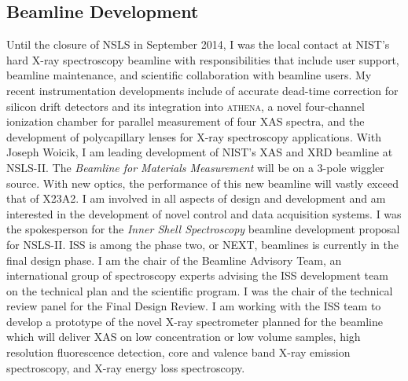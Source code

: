 \documentclass[11pt]{moderncv}
\begin{document}
\subsection{Beamline Development}
%
{Until the closure of NSLS in September 2014, I was the local contact
  at NIST's hard X-ray spectroscopy beamline with responsibilities
  that include user support, beamline maintenance, and scientific
  collaboration with beamline users.  My recent instrumentation
  developments include of accurate dead-time correction for silicon
  drift detectors and its integration into \textsc{athena}, a novel
  four-channel ionization chamber for parallel measurement of four XAS
  spectra, and the development of polycapillary lenses for X-ray
  spectroscopy applications.}
%
%
{With Joseph Woicik, I am leading development of NIST's XAS and XRD
  beamline at NSLS-II.  The \textit{Beamline for Materials
    Measurement} will be on a 3-pole wiggler source.  With new optics,
  the performance of this new beamline will vastly exceed that of
  X23A2.  I am involved in all aspects of design and development and
  am interested in the development of novel control and data
  acquisition systems.}
%
%
{I was the spokesperson for the \textit{Inner Shell Spectroscopy}
  beamline development proposal for NSLS-II.  ISS is among the phase
  two, or NEXT, beamlines is currently in the final design phase.  I
  am the chair of the Beamline Advisory Team, an international group
  of spectroscopy experts advising the ISS development team on the
  technical plan and the scientific program.  I was the chair of
  the technical review panel for the Final Design Review.  I am
  working with the ISS team to develop a prototype of the novel X-ray
  spectrometer planned for the beamline which will deliver XAS on low
  concentration or low volume samples, high resolution fluorescence
  detection, core and valence band X-ray emission spectroscopy, and
  X-ray energy loss spectroscopy.}


\end{document}

